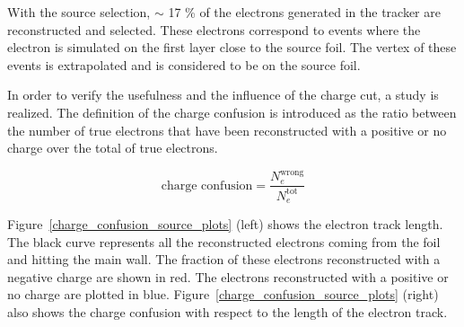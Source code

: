 \documentclass[main.tex]{subfiles}
\begin{document}
\bigskip


\noindent With the source selection, $\sim$ 17 \% of the electrons generated in the tracker are reconstructed and selected. These electrons correspond to events where the electron is simulated on the first layer close to the source foil. The vertex of these events is extrapolated and is considered to be on the source foil.


\bigskip


\noindent In order to verify the usefulness and the influence of the charge cut, a study is realized. The definition of the charge confusion is introduced as the ratio between the number of true electrons that have been reconstructed with a positive or no charge over the total of true electrons.


\begin{equation}
\text{charge confusion} = \frac{N_e^{\text{wrong}}}{N_e^{\text{tot}}}
\end{equation}     


\bigskip


\noindent Figure~\ref{charge_confusion_source_plots} (left) shows the electron track length. The black curve represents all the reconstructed electrons coming from the foil and hitting the main wall. The fraction of these electrons reconstructed with a negative charge are shown in red. The electrons reconstructed with a positive or no charge are plotted in blue. Figure~\ref{charge_confusion_source_plots} (right) also shows the charge confusion with respect to the length of the electron track. 

\bigskip
\end{document}
